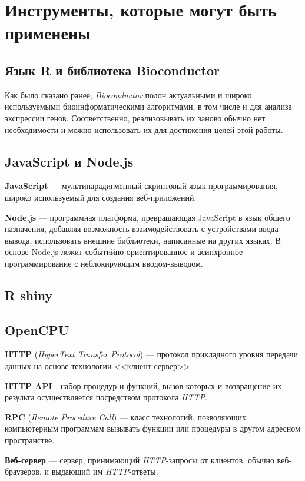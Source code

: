 \documentclass[annotation,specification]{itmo-student-thesis}
\begin{document}
\section{Инструменты, которые могут быть применены}
\subsection{Язык R и библиотека Bioconductor}
Как было сказано ранее, \emph{Bioconductor} полон актуальными и широко используемыми биоинформатическими алгоритмами, в том числе и для анализа экспрессии генов. Соответственно, реализовывать их заново обычно нет необходимости и можно использовать их для достижения целей этой работы.

\subsection{JavaScript и Node.js}
\textbf{JavaScript} --- мультипарадигменный скриптовый язык программирования, широко используемый для создания веб-приложений.

\textbf{Node.js} --- программная платформа, превращающая JavaScript в язык общего назначения, добавляя возможность взаимодействовать с устройствами ввода-вывода, использовать внешние библиотеки, написанные на других языках. В основе Node.js лежит событийно-ориентированное и асинхронное программирование с неблокирующим вводом-выводом.~\cite{nodejs}

\subsection{R shiny}
\subsection{OpenCPU}
\textbf{HTTP} (\emph{HyperText Transfer Protocol}) ---  протокол прикладного уровня передачи данных на основе технологии <<клиент-сервер>>~\cite{http}.

\textbf{HTTP API} - набор процедур и функций, вызов которых и возвращение их результа осуществляется посредством протокола \emph{HTTP}.

\textbf{RPC} (\emph{Remote Procedure Call}) --- класс технологий, позволяющих компьютерным программам вызывать функции или процедуры в другом адресном пространстве.

\textbf{Веб-сервер} --- сервер, принимающий \emph{HTTP}-запросы от клиентов, обычно веб-браузеров, и выдающий им \emph{HTTP}-ответы.
\end{document}
